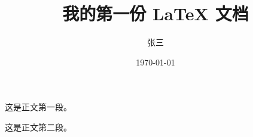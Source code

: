 \documentclass[12pt,a4paper]{ctexart} %
\title{我的第一份 LaTeX 文档} %
\author{张三} %
\date{\today} %
\begin{document}

\maketitle %

这是正文第一段。 %

这是正文第二段。 %
\end{document}
